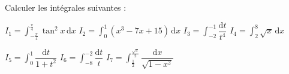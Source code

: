 
\begin{exercice}\label{exoautoanalyseCTU-15}


Calculer les intégrales suivantes : 


$I_{1}=\displaystyle\int_{-\frac{\pi}{4}}^{\frac{\pi}{4}}\tan^2x \,\mathrm dx$ 
\qquad $I_{2}=\displaystyle\int_{0}^{1}(x^3-7x+15) \,\mathrm dx$ 
\qquad $I_{3}=\displaystyle\int_{-2}^{-1}\dfrac{\mathrm dt}{t^4}$ 
 \qquad $I_{4}=\displaystyle\int_{2}^{8}\sqrt{x} \,\mathrm dx$ 


$I_{5}=\displaystyle\int_{0}^{1}\dfrac{\mathrm dt}{1+t^2}$ 
\qquad $I_{6}=\displaystyle\int_{-8}^{-2}\dfrac{\mathrm dt}{t}$ 
 \qquad $I_{7}=\displaystyle\int_{\frac{1}{2}}^{\frac{\sqrt{3}}{2}}\dfrac{\mathrm dx}{\sqrt{1-x^2}}$ 






\end{exercice}
